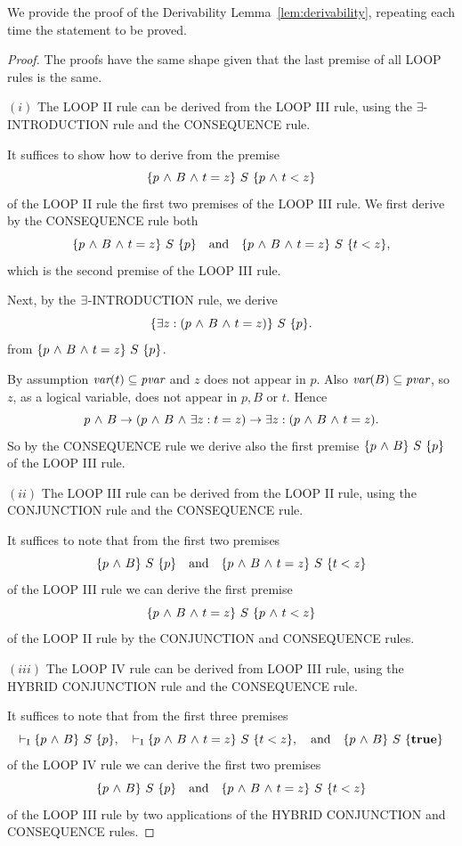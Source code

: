 \documentclass[manuscript, screen, review]{acmart}
\begin{document}
We provide the proof of the Derivability Lemma~\ref{lem:derivability}, 
repeating each time the statement to be proved.

\begin{proof}
The proofs have the same shape given that the last premise of all LOOP rules is the same.
  
\NI
$(i)$ The {\rm LOOP II} rule can be derived from the {\rm LOOP III} rule, using
   the  $\exists$-{\rm INTRODUCTION} rule and the {\rm CONSEQUENCE} rule.
   

It suffices to show how to derive from the premise
\[
  \mbox{$\{{p \mbox{$\ \wedge\ $} B \mbox{$\ \wedge\ $} t=z}\}\ {S}\ \{{p \mbox{$\ \wedge\ $} t<z}\}$}
\]
of the LOOP II rule the first two premises of the LOOP III rule.  We
first derive by the CONSEQUENCE rule both
\[
 \mbox{$\{{p \mbox{$\ \wedge\ $} B \mbox{$\ \wedge\ $} t=z}\}\ {S}\ \{{p}\}$} \quad \mbox{\rm and} \quad
\mbox{$\{{p \mbox{$\ \wedge\ $} B \mbox{$\ \wedge\ $} t=z}\}\ {S}\ \{{t<z}\}$},
\]
which is the second premise of the LOOP III rule.

Next, by the $\mbox{$\exists$}$-INTRODUCTION rule, we derive 
\[
 \mbox{$\{{\mbox{$\exists$} z: (p \mbox{$\ \wedge\ $} B \mbox{$\ \wedge\ $} t=z)}\}\ {S}\ \{{p}\}$}.
\]
from
$\mbox{$\{{p \mbox{$\ \wedge\ $} B \mbox{$\ \wedge\ $} t=z}\}\ {S}\ \{{p}\}$}$.

By assumption $\mbox{\it var}(t)\subseteq \mbox{\it pvar}$ and $z$ does not appear in $p$. Also
$\mbox{\it var}(B)\subseteq \mbox{\it pvar}$, so
$z$, as a logical variable, does not appear
in $p, B$ or $t$. Hence
\[
  p \mbox{$\ \wedge\ $} B \to (p \mbox{$\ \wedge\ $} B \mbox{$\ \wedge\ $} \mbox{$\exists$} z: t=z) \to  \mbox{$\exists$} z: (p \mbox{$\ \wedge\ $} B \mbox{$\ \wedge\ $} t=z).
\]
So by the CONSEQUENCE rule we derive also the first premise
$\mbox{$\{{p \mbox{$\ \wedge\ $} B}\}\ {S}\ \{{p}\}$}$ of the LOOP III rule.
\III

\NI
$(ii)$ The {\rm LOOP III} rule can be derived from the {\rm LOOP II} rule, using
   the {\rm CONJUNCTION} rule and the {\rm CONSEQUENCE} rule.
   
It suffices to note that from the first two premises 
\[
  \mbox{$\{{p \mbox{$\ \wedge\ $} B}\}\ {S}\ \{{p}\}$}\quad \mbox{\rm and} \quad
   \mbox{$\{{p \mbox{$\ \wedge\ $} B \mbox{$\ \wedge\ $} t=z}\}\ {S}\ \{{t<z}\}$}
\]
of the LOOP III rule we can derive the first premise
\[
  \mbox{$\{{p \mbox{$\ \wedge\ $} B \mbox{$\ \wedge\ $} t=z}\}\ {S}\ \{{p \mbox{$\ \wedge\ $} t<z}\}$}
\]
of the LOOP II rule by the CONJUNCTION and CONSEQUENCE rules.
\III

\NI
$(iii)$ 
The {\rm LOOP IV} rule can be derived from {\rm LOOP III} rule, using
the  {\rm HYBRID CONJUNCTION} rule and the {\rm CONSEQUENCE} rule.

It suffices to note that from the first three premises 
\[
  \vdash_{\rm{I}}  \mbox{$\{{p \mbox{$\ \wedge\ $} B}\}\ {S}\ \{{p}\}$},\quad
  \vdash_{\rm{I}}  \mbox{$\{{p \mbox{$\ \wedge\ $} B \mbox{$\ \wedge\ $} t=z}\}\ {S}\ \{{t<z}\}$},\quad
\mbox{\rm and} \quad
 \mbox{$\{{p \mbox{$\ \wedge\ $} B}\}\ {S}\ \{{\mathbf{true}}\}$}
\]
of the LOOP IV rule
we can derive the first two premises
\[
  \mbox{$\{{p \mbox{$\ \wedge\ $} B}\}\ {S}\ \{{p}\}$} \quad
  \mbox{\rm and} \quad \mbox{$\{{p \mbox{$\ \wedge\ $} B \mbox{$\ \wedge\ $} t=z}\}\ {S}\ \{{t<z}\}$}
\]
of the LOOP III rule by two applications of the HYBRID CONJUNCTION and
CONSEQUENCE rules.
\III


\end{proof}
\end{document}

